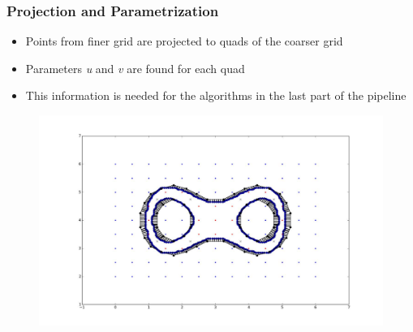 \begin{frame}

	\frametitle{Projection and Parametrization}
	
	\begin{itemize}
	\item Points from finer grid are projected to quads of the coarser grid 
	\item Parameters \textit{u} and \textit{v} are found for each quad
	\item This information is needed for the algorithms in the last part of the pipeline
	\end{itemize}
	\begin{figure}
	\includegraphics[scale=0.35]{Pictures/DC/DC_2.pdf}
	\end{figure}
	
\end{frame}





